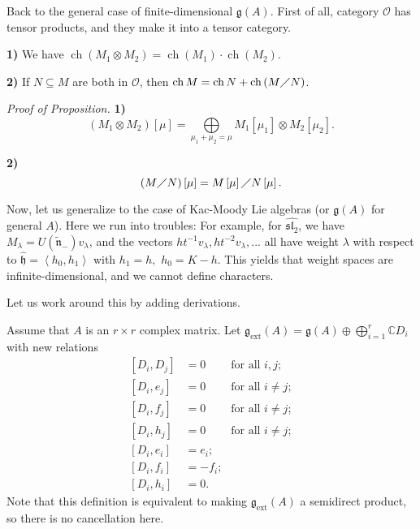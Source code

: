 \documentclass[etingof-lie.tex]{subfiles}
\begin{document}
Back to the general case of finite-dimensional $\mathfrak{g}\left(  A\right)
$. First of all, category $\mathcal{O}$ has tensor products, and they make it
into a tensor category.

\begin{proposition}
\textbf{1)} We have $\operatorname*{ch}\left(  M_{1}\otimes M_{2}\right)
=\operatorname*{ch}\left(  M_{1}\right)  \cdot\operatorname*{ch}\left(
M_{2}\right)  $.

\textbf{2)} If $N\subseteq M$ are both in $\mathcal{O}$, then
$\operatorname*{ch}M=\operatorname*{ch}N+\operatorname*{ch}\left(  M\diagup
N\right)  $.
\end{proposition}

\textit{Proof of Proposition.} \textbf{1)}
\[
\left(  M_{1}\otimes M_{2}\right)  \left[  \mu\right]  =\bigoplus
\limits_{\mu_{1}+\mu_{2}=\mu}M_{1}\left[  \mu_{1}\right]  \otimes M_{2}\left[
\mu_{2}\right]  .
\]


\textbf{2)}
\[
\left(  M\diagup N\right)  \left[  \mu\right]  =M\left[  \mu\right]  \diagup
N\left[  \mu\right]  .
\]


Now, let us generalize to the case of Kac-Moody Lie algebras (or
$\mathfrak{g}\left(  A\right)  $ for general $A$). Here we run into troubles:
For example, for $\widehat{\mathfrak{sl}_{2}}$, we have $M_{\lambda}=U\left(
\widetilde{\mathfrak{n}}_{-}\right)  v_{\lambda}$, and the vectors
$ht^{-1}v_{\lambda},ht^{-2}v_{\lambda},...$ all have weight $\lambda$ with
respect to $\widehat{\mathfrak{h}}=\left\langle h_{0},h_{1}\right\rangle $
with $h_{1}=h,$ $h_{0}=K-h$. This yields that weight spaces are
infinite-dimensional, and we cannot define characters.

Let us work around this by adding derivations.

Assume that $A$ is an $r\times r$ complex matrix. Let $\mathfrak{g}%
_{\operatorname*{ext}}\left(  A\right)  =\mathfrak{g}\left(  A\right)
\oplus\bigoplus\limits_{i=1}^{r}\mathbb{C}D_{i}$ with new relations%
\begin{align*}
\left[  D_{i},D_{j}\right]   &  =0\ \ \ \ \ \ \ \ \ \ \text{for all }i,j;\\
\left[  D_{i},e_{j}\right]   &  =0\ \ \ \ \ \ \ \ \ \ \text{for all }i\neq
j;\\
\left[  D_{i},f_{j}\right]   &  =0\ \ \ \ \ \ \ \ \ \ \text{for all }i\neq
j;\\
\left[  D_{i},h_{j}\right]   &  =0\ \ \ \ \ \ \ \ \ \ \text{for all }i\neq
j;\\
\left[  D_{i},e_{i}\right]   &  =e_{i};\\
\left[  D_{i},f_{i}\right]   &  =-f_{i};\\
\left[  D_{i},h_{i}\right]   &  =0.
\end{align*}
Note that this definition is equivalent to making $\mathfrak{g}%
_{\operatorname*{ext}}\left(  A\right)  $ a semidirect product, so there is no
cancellation here.
\end{document}
